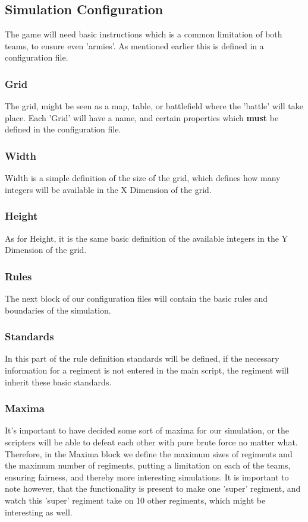 								\subsection{Simulation Configuration}
								The game will need basic instructions which is a common limitation of both teams, to ensure even 'armies'. As mentioned earlier this is defined in a configuration file.
								\subsubsection{Grid}
								The grid, might be seen as a map, table, or battlefield where the 'battle' will take place. Each 'Grid' will have a name, and certain properties which \textbf{must} be defined in the configuration file.
								\subsubsection{Width}
								Width is a simple definition of the size of the grid, which defines how many integers will be available in the X Dimension of the grid.
								\subsubsection{Height}
								As for Height, it is the same basic definition of the available integers in the Y Dimension of the grid.
								\subsubsection{Rules}
								The next block of our configuration files will contain the basic rules and boundaries of the simulation.
								\subsubsection{Standards}
								In this part of the rule definition standards will be defined, if the necessary information for a regiment is not entered in the main script, the regiment will inherit these basic standards.
								\subsubsection{Maxima}
								It's important to have decided some sort of maxima for our simulation, or the scripters will be able to defeat each other with pure brute force no matter what.
								Therefore, in the Maxima block we define the maximum sizes of regiments and the maximum number of regiments, putting a limitation on each of the teams, ensuring fairness, and thereby more interesting simulations. It is important to note however, that the functionality is present to make one 'super' regiment, and watch this 'super' regiment take on 10 other regiments, which might be interesting as well.
																